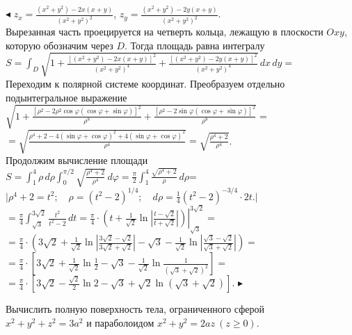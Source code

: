 \documentclass[a5paper,10pt]{article}
\begin{document}
\smallskip
\noindent $\blacktriangleleft$ $\displaystyle z_x=\frac{(x^2+y^2)-2x(x+y)}{(x^2+y^2)^2}$,
$\displaystyle z_y=\frac{(x^2+y^2)-2y(x+y)}{(x^2+y^2)^2}$.\\
Вырезанная часть проецируется на четверть кольца, лежащую в плоскости $Oxy$, которую обозначим через $D$.
Тогда площадь равна интегралу\\
$\displaystyle S=\int_D\sqrt{1+\frac{[(x^2+y^2)-2x(x+y)]^2}{(x^2+y^2)^4}+\frac{[(x^2+y^2)-2y(x+y)]^2}{(x^2+y^2)^4}}\,dx\,dy=$\\
Переходим к полярной системе координат. Преобразуем отдельно подынтегральное выражение\\
$\displaystyle \sqrt{1+\frac{[\rho^2-2\rho^2\cos\varphi(\cos\varphi+\sin\varphi)]^2}{\rho^8}+
\frac{[\rho^2-2\sin\varphi(\cos\varphi+\sin\varphi)]^2}{\rho^8}}=$\\
$\displaystyle =\sqrt{\frac{\rho^4+2-4(\sin\varphi+\cos\varphi)^2+4(\sin\varphi+\cos\varphi)^2}{\rho^4}}=
\sqrt{\frac{\rho^4+2}{\rho^4}}$.\\
Продолжим вычисление площади\\
$\displaystyle S=\int_1^4\rho\,d\rho\int_0^{\pi/2}\sqrt{\frac{\rho^4+2}{\rho^4}}\,d\varphi=
\frac{\pi}{2}\int_1^4\frac{\sqrt{\rho^4+2}}{\rho}\,d\rho$=\\
$\displaystyle\Big|\rho^4+2=t^2;\quad \rho=(t^2-2)^{1/4};\quad d\rho=\frac 14(t^2-2)^{-3/4}\cdot 2t.\Big|$\\
$\displaystyle =\frac{\pi}{4}\int_{\sqrt3}^{3\sqrt2}\frac{t^2}{t^2-2}\,dt=
\frac{\pi}{4}\cdot\left.\left(t+\frac{1}{\sqrt2}\ln\left|\frac{t-\sqrt2}{t+\sqrt2}\right|\right)\right|_{\sqrt3}^{3\sqrt2}=$\\
$\displaystyle =\frac{\pi}{4}\cdot\left(3\sqrt2+\frac{1}{\sqrt2}\ln\left|\frac{3\sqrt2-\sqrt2}{3\sqrt2+\sqrt2}\right|
-\sqrt3-\frac{1}{\sqrt2}\ln\left|\frac{\sqrt3-\sqrt2}{\sqrt3+\sqrt2}\right|\right)=$\\
$\displaystyle =\frac{\pi}{4}\cdot\left[3\sqrt2+\frac{1}{\sqrt2}\ln\frac{1}{2}
-\sqrt3-\frac{1}{\sqrt2}\ln\frac{1}{(\sqrt3+\sqrt2)^2}\right]=$\\
$\displaystyle =\frac{\pi}{4}\cdot\left[3\sqrt2-\frac{\sqrt2}{2}\ln2
-\sqrt3+\sqrt2\ln(\sqrt3+\sqrt2)\right]$.
$\blacktriangleright$

\medskip
{} Вычислить полную поверхность тела, ограниченного сферой\\
$x^2+y^2+z^2=3a^2$ и параболоидом $x^2+y^2=2az\ (z\ge 0)$.
\end{document}
